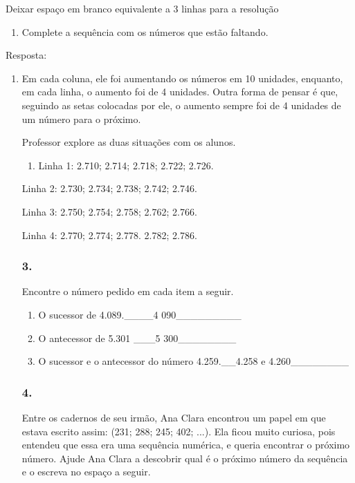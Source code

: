 \begin{enumerate}
\begin{escolha}
Deixar espaço em branco equivalente a 3 linhas para a resolução

\begin{enumerate}
\def\labelenumi{\alph{enumi})}
\item
  Complete a sequência com os números que estão faltando.
\end{enumerate}

Resposta:

\begin{enumerate}
\def\labelenumi{\alph{enumi})}
\item
  Em cada coluna, ele foi aumentando os números em 10 unidades, enquanto,
  em cada linha, o aumento foi de 4 unidades. Outra forma de pensar é que, seguindo as setas colocadas
por ele, o aumento sempre foi de 4 unidades de um número para o próximo.

Professor explore as duas situações com os alunos.

\begin{enumerate}
\def\labelenumi{\alph{enumi})}
\item
  Linha 1: 2.710; 2.714; 2.718; 2.722; 2.726.
\end{enumerate}

Linha 2: 2.730; 2.734; 2.738; 2.742; 2.746.

Linha 3: 2.750; 2.754; 2.758; 2.762; 2.766.

Linha 4: 2.770; 2.774; 2.778. 2.782; 2.786.


\subsubsection{3.}\label{section-28}

Encontre o número pedido em cada item a seguir.

\begin{enumerate}
\def\labelenumi{\alph{enumi})}
\item
  O sucessor de 4.089.\_\_\_\_4 090\_\_\_\_\_\_\_\_\_
\item
  O antecessor de 5.301 \_\_\_5 300\_\_\_\_\_\_\_\_
\item
  O sucessor e o antecessor do número 4.259.\_\_4.258 e 4.260\_\_\_\_\_\_\_\_
\end{enumerate}


\subsubsection{4.}\label{section-29}

Entre os cadernos de seu irmão, Ana Clara encontrou um papel em que estava escrito assim: (231; 288; 245; 402; ...). Ela ficou muito curiosa, pois entendeu que essa era uma sequência
numérica, e queria encontrar o próximo número. Ajude Ana Clara a descobrir qual é o próximo número da sequência e o
escreva no espaço a seguir.


\end{enumerate}
\end{escolha}
\end{enumerate}
